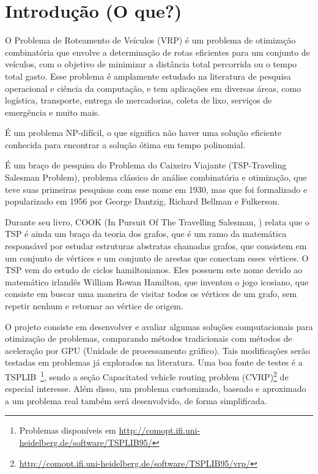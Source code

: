 \documentclass[
    openany,
    12pt,
    a4paper,
    twoside,
    english,
    brazil, sumario=tradicional
]{/home/lucas_galdino/Desktop/TCC/planning/abntex2/abntex2}
\renewcommand{\cleardoublepage}{}
\let\oldchapter\chapter
\renewcommand{\chapter}{\clearpage\oldchapter}
\begin{document}

\imprimircapa

\imprimirfolhaderosto*

\tableofcontents
\cleardoublepage

\cleardoublepage
\textual



\chapter{Introdução (O que?)}

O Problema de Roteamento de Veículos (VRP) é um problema de otimização combinatória que envolve a determinação de rotas eficientes para um conjunto de veículos, com o objetivo de minimizar a distância total percorrida ou o tempo total gasto\@. Esse problema é amplamente estudado na literatura de pesquisa operacional e ciência da computação, e tem aplicações em diversas áreas, como logística, transporte, entrega de mercadorias, coleta de lixo, serviços de emergência e muito mais.

É um problema NP-difícil, o que significa não haver uma solução eficiente conhecida para encontrar a solução ótima em tempo polinomial. 

É um braço de pesquisa do Problema do Caixeiro Viajante (TSP-Traveling Salesman Problem), problema clássico de análise combinatória e otimização, que teve suas primeiras pesquisas com esse nome em 1930, mas que foi formalizado e popularizado em 1956 por George Dantzig, Richard Bellman e Fulkerson. 

Durante seu livro, COOK (In Pursuit Of The Travelling Salesman, \citeyear{pursuit_travelling_salesman}) relata que o TSP é ainda um braço da teoria dos grafos, que é um ramo da matemática responsável por estudar estruturas abstratas chamadas grafos, que consistem em um conjunto de vértices e um conjunto de arestas que conectam esses vértices. O TSP vem do estudo de ciclos hamiltonianos. Eles possuem este nome devido ao matemático irlandês William Rowan Hamilton, que inventou o jogo icosiano, que consiste em buscar uma maneira de visitar todos os vértices de um grafo, sem repetir nenhum e retornar ao vértice de origem.

O projeto consiste em desenvolver e avaliar algumas soluções computacionais para otimização de problemas, comparando métodos tradicionais com métodos de aceleração por GPU (Unidade de processamento gráfico). Tais modificações serão testadas em problemas já explorados na literatura. Uma boa fonte de testes é a TSPLIB~\cite{tsplib_ref}\footnote{Problemas disponíveis em \url{http://comopt.ifi.uni-heidelberg.de/software/TSPLIB95/}}, sendo a seção Capacitated vehicle routing problem (CVRP)\footnote{\url{http://comopt.ifi.uni-heidelberg.de/software/TSPLIB95/vrp/}} de especial interesse. Além disso, um problema customizado, baseado e aproximado a um problema real também será desenvolvido, de forma simplificada.
\end{document}
